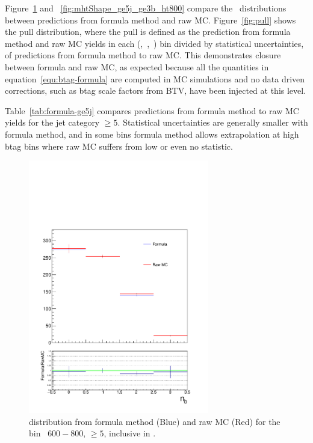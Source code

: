 Figure~\ref{fig:mhtShape_ge5j_ge3b_ht600} and ~\ref{fig:mhtShape_ge5j_ge3b_ht800} 
compare the \nb~distributions between predictions from formula method and raw MC. Figure~\ref{fig:pull} shows
the pull distribution, where the pull is defined as the prediction from
 formula method and raw MC yields in each (\njet,~\scalht,~\mht) bin divided by statistical
 uncertainties, of predictions from formula method to raw MC. 
This demonstrates closure between formula and raw MC, as expected because 
 all the quantities in equation~\ref{equ:btag-formula} are computed in MC simulations and 
 no data driven corrections, such as btag scale factors from BTV, have been injected at this level.

Table~\ref{tab:formula-ge5j} compares
predictions from formula method to raw MC yields for the jet category \njet $\geq 5$. 
Statistical uncertainties are generally smaller with formula
method, and in some bins formula method allows extrapolation at high btag bins 
where raw MC suffers from low or even no statistic.

 \begin{figure}[h!]
  \centering
  \includegraphics[width=0.7\textwidth]{figures/btagformula/ge5j_600_0_Inc_GoodNb.pdf} 
  \caption{\label{fig:mhtShape_ge5j_ge3b_ht600} \nb distribution from formula
   method (Blue) and raw MC (Red) for the bin \scalht~$600-800$, \njet $\geq 5$, inclusive
   in \mht.}
\end{figure}

